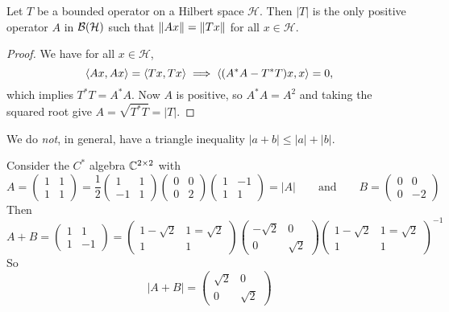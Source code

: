 \begin{lemma}
Let $T$ be a bounded operator on a Hilbert space $\mathcal{H}$. Then $|T|$ is the only positive operator $A$ in $\operatorname{\mathcal{B}}(\mathcal{H})$ such that $\lVert Ax\rVert = \lVert Tx\rVert$ for all $x\in\mathcal{H}$.
\end{lemma}
\begin{proof}
We have for all $x\in\mathcal{H}$,
\[ \left\langle Ax,Ax \right\rangle = \left\langle Tx,Tx \right\rangle \implies \left\langle (A^*A-T^*T)x,x \right\rangle=0, \]
which implies $T^*T = A^*A$. Now $A$ is positive, so $A^*A = A^2$ and taking the squared root give $A = \sqrt{T^*T} = |T|$.
\end{proof}

We do \emph{not}, in general, have a triangle inequality $|a+b| \leq |a| + |b|$.
\begin{example}
Consider the $C^*$ algebra $\mathbb{C}^{2\times 2}$ with
\[ A = \begin{pmatrix}
1 & 1 \\ 1 & 1
\end{pmatrix} = \frac{1}{2}\begin{pmatrix}
1 & 1 \\ -1 & 1
\end{pmatrix}\begin{pmatrix}
0 & 0 \\ 0 & 2
\end{pmatrix}\begin{pmatrix}
1 & -1 \\ 1 & 1
\end{pmatrix} = |A| \qquad\text{and}\qquad B = \begin{pmatrix}
0 & 0 \\ 0 & -2
\end{pmatrix} \]
Then
\[ A + B = \begin{pmatrix}
1 & 1 \\ 1 & -1
\end{pmatrix} = \begin{pmatrix}
1-\sqrt{2} & 1=\sqrt{2} \\ 1 & 1
\end{pmatrix}\begin{pmatrix}
-\sqrt{2} & 0 \\ 0 & \sqrt{2}
\end{pmatrix}\begin{pmatrix}
1-\sqrt{2} & 1=\sqrt{2} \\ 1 & 1
\end{pmatrix}^{-1} \]
So
\[ |A+B| = \begin{pmatrix}
\sqrt{2} & 0 \\ 0 & \sqrt{2}

\end{pmatrix}\]
\end{example}
